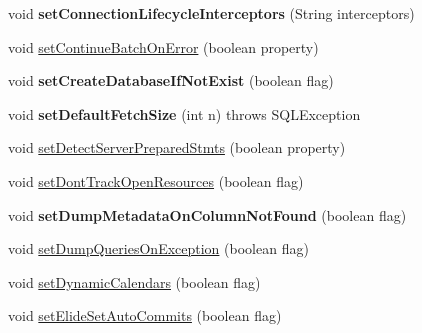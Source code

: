 \begin{DoxyCompactItemize}
void {\bfseries set\+Connection\+Lifecycle\+Interceptors} (String interceptors)
\item 
void \mbox{\hyperlink{classcom_1_1mysql_1_1jdbc_1_1jdbc2_1_1optional_1_1_connection_wrapper_a0d0494da50a007f3aea31ada724385d9}{set\+Continue\+Batch\+On\+Error}} (boolean property)
\item 
\mbox{\label{classcom_1_1mysql_1_1jdbc_1_1jdbc2_1_1optional_1_1_connection_wrapper_a8911de7e426a6525d379125fe59c20d3}} 
void {\bfseries set\+Create\+Database\+If\+Not\+Exist} (boolean flag)
\item 
\mbox{\label{classcom_1_1mysql_1_1jdbc_1_1jdbc2_1_1optional_1_1_connection_wrapper_ae916cc6b6dfc5cd5cff1a8ec0af9c979}} 
void {\bfseries set\+Default\+Fetch\+Size} (int n)  throws S\+Q\+L\+Exception 
\item 
void \mbox{\hyperlink{classcom_1_1mysql_1_1jdbc_1_1jdbc2_1_1optional_1_1_connection_wrapper_a0c80fd9ac23df453f078c771d7b88760}{set\+Detect\+Server\+Prepared\+Stmts}} (boolean property)
\item 
void \mbox{\hyperlink{classcom_1_1mysql_1_1jdbc_1_1jdbc2_1_1optional_1_1_connection_wrapper_abae4382f9155415413562a3593b61a5d}{set\+Dont\+Track\+Open\+Resources}} (boolean flag)
\item 
\mbox{\label{classcom_1_1mysql_1_1jdbc_1_1jdbc2_1_1optional_1_1_connection_wrapper_a60fb6cc4bc31fccc54b794920b2fc687}} 
void {\bfseries set\+Dump\+Metadata\+On\+Column\+Not\+Found} (boolean flag)
\item 
void \mbox{\hyperlink{classcom_1_1mysql_1_1jdbc_1_1jdbc2_1_1optional_1_1_connection_wrapper_a0e4c6f477c15bd82e03a4376fbef7124}{set\+Dump\+Queries\+On\+Exception}} (boolean flag)
\item 
void \mbox{\hyperlink{classcom_1_1mysql_1_1jdbc_1_1jdbc2_1_1optional_1_1_connection_wrapper_a0f42541efa793fe1588d0807c2ffab92}{set\+Dynamic\+Calendars}} (boolean flag)
\item 
void \mbox{\hyperlink{classcom_1_1mysql_1_1jdbc_1_1jdbc2_1_1optional_1_1_connection_wrapper_ae265f34efd113d6df170b5354eb960f0}{set\+Elide\+Set\+Auto\+Commits}} (boolean flag)
\item 
\mbox{\label{classcom_1_1mysql_1_1jdbc_1_1jdbc2_1_1optional_1_1_connection_wrapper_a472b44fd734a3edf5d2f0d2473ba3fea}} 

\end{DoxyCompactItemize}
